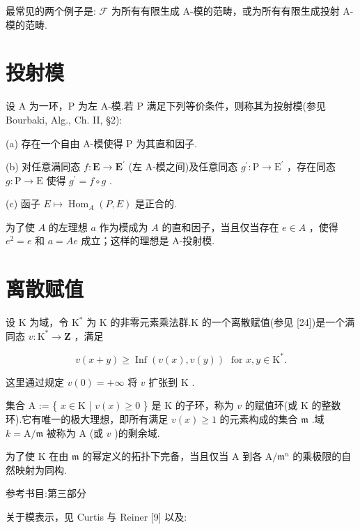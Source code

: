 \documentclass[10pt]{article}
\begin{document}
最常见的两个例子是: \(\mathcal{F}\) 为所有有限生成 A-模的范畴，或为所有有限生成投射 A-模的范畴.

\section*{投射模}

设 A 为一环，P 为左 A-模.若 P 满足下列等价条件，则称其为投射模(参见 Bourbaki, Alg., Ch. II, §2):

(a) 存在一个自由 A-模使得 \(\mathrm{P}\) 为其直和因子.

(b) 对任意满同态 \(f : \mathbf{E} \rightarrow  {\mathbf{E}}^{\prime }\) (左 A-模之间)及任意同态 \({g}^{\prime } : \mathrm{P} \rightarrow  {\mathrm{E}}^{\prime }\) ，存在同态 \(g : \mathrm{P} \rightarrow  \mathrm{E}\) 使得 \({g}^{\prime } = f \circ  g\) .

(c) 函子 \(E \mapsto  {\operatorname{Hom}}_{A}\left( {P,E}\right)\) 是正合的.

为了使 \(A\) 的左理想 \(a\) 作为模成为 \(A\) 的直和因子，当且仅当存在 \(e \in  A\) ，使得 \({e}^{2} = e\) 和 \(a = {Ae}\) 成立；这样的理想是 A-投射模.

\section*{离散赋值}

设 \(\mathrm{K}\) 为域，令 \({\mathrm{K}}^{ * }\) 为 K 的非零元素乘法群.K 的一个离散赋值(参见 [24])是一个满同态 \(v : {\mathrm{K}}^{ * } \rightarrow  \mathbf{Z}\) ，满足

\[
v\left( {x + y}\right)  \geq  \operatorname{Inf}\left( {v\left( x\right) ,v\left( y\right) }\right) \;\text{ for }x,y \in  {\mathrm{K}}^{ * }.
\]

这里通过规定 \(v\left( 0\right)  =  + \infty\) 将 \(v\) 扩张到 \(\mathrm{K}\) .

集合 \(\mathrm{A}\) := \{ \(x \in  \mathrm{K}\) | \(v\left( x\right)  \geq  0\) \} 是 \(\mathrm{K}\) 的子环，称为 \(v\) 的赋值环(或 \(\mathrm{K}\) 的整数环).它有唯一的极大理想，即所有满足 \(v\left( x\right)  \geq  1\) 的元素构成的集合 \(\mathfrak{m}\) .域 \(k = \mathrm{A}/\mathfrak{m}\) 被称为 \(\mathrm{A}\) (或 \(v\) )的剩余域.

为了使 \(\mathrm{K}\) 在由 \(\mathfrak{m}\) 的幂定义的拓扑下完备，当且仅当 A 到各 \(\mathrm{A}/{\mathfrak{m}}^{n}\) 的乘极限的自然映射为同构.

参考书目:第三部分

关于模表示，见 Curtis 与 Reiner [9] 以及:
\end{document}
